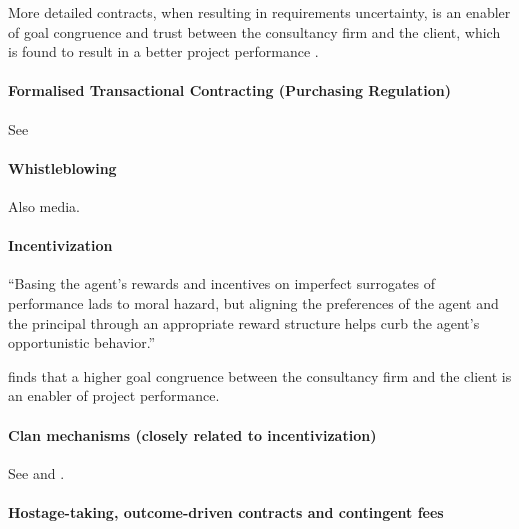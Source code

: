 \documentclass[12pt]{article}
\begin{document}
More detailed contracts, when resulting in requirements uncertainty, is
an enabler of goal congruence and trust between the consultancy firm and
the client, which is found to result in a better project performance
\citep{liberatore264}.

\hypertarget{formalised-transactional-contracting-purchasing-regulation}{%
\paragraph{Formalised Transactional Contracting (Purchasing
Regulation)}\label{formalised-transactional-contracting-purchasing-regulation}}

See \citet[4-5]{sturdy2021}

\hypertarget{whistleblowing}{%
\paragraph{Whistleblowing}\label{whistleblowing}}

Also media.

\hypertarget{incentivization}{%
\paragraph{Incentivization}\label{incentivization}}

``Basing the agent's rewards and incentives on imperfect surrogates of
performance lads to moral hazard, but aligning the preferences of the
agent and the principal through an appropriate reward structure helps
curb the agent's opportunistic behavior.'' \citep[ 13]{basu2011}

\citet[264-266]{liberatore2010} finds that a higher goal congruence
between the consultancy firm and the client is an enabler of project
performance.

\hypertarget{clan-mechanisms-closely-related-to-incentivization}{%
\paragraph{Clan mechanisms (closely related to
incentivization)}\label{clan-mechanisms-closely-related-to-incentivization}}

See \citet[62]{aubert1996} and \citet{ouchi1980}.

\hypertarget{hostage-taking-outcome-driven-contracts-and-contingent-fees}{%
\paragraph{Hostage-taking, outcome-driven contracts and contingent
fees}\label{hostage-taking-outcome-driven-contracts-and-contingent-fees}}
\end{document}
